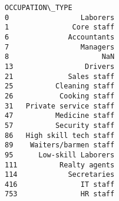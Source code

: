 \documentclass[11pt]{article}
\makeatletter
\newcommand{\boxspacing}{\kern\kvtcb@left@rule\kern\kvtcb@boxsep}
\newcommand{\prompt}[4]{
        {\ttfamily\llap{{\color{#2}[#3]:\hspace{3pt}#4}}\vspace{-\baselineskip}}
    }
\makeatother
\begin{document}
            \begin{tcolorbox}[breakable, size=fbox, boxrule=.5pt, pad at break*=1mm, opacityfill=0]
\prompt{Out}{outcolor}{81}{\boxspacing}
\begin{Verbatim}[commandchars=\\\{\}]
           OCCUPATION\_TYPE
0                 Laborers
1               Core staff
6              Accountants
7                 Managers
8                      NaN
13                 Drivers
21             Sales staff
25          Cleaning staff
26           Cooking staff
31   Private service staff
47          Medicine staff
57          Security staff
86   High skill tech staff
89    Waiters/barmen staff
95      Low-skill Laborers
111          Realty agents
114            Secretaries
416               IT staff
753               HR staff
\end{Verbatim}
\end{tcolorbox}
        

    
    
    
\end{document}

